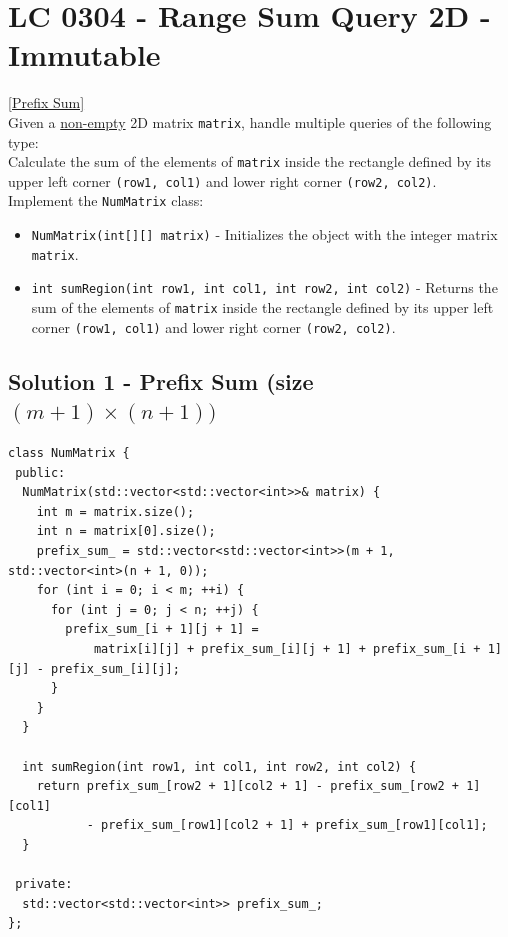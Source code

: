 \section{LC 0304 - Range Sum Query 2D - Immutable}\label{lc0304}
\hyperref[sec:prefix_sum]{[Prefix Sum]}\\

Given a \ul{non-empty} 2D matrix {\colorbox{CodeBackground}{\lstinline|matrix|}}, handle multiple queries of the following type:\\

Calculate the sum of the elements of {\colorbox{CodeBackground}{\lstinline|matrix|}} inside the rectangle defined by its upper left corner {\colorbox{CodeBackground}{\lstinline|(row1, col1)|}} and lower right corner {\colorbox{CodeBackground}{\lstinline|(row2, col2)|}}.\\

Implement the {\colorbox{CodeBackground}{\lstinline|NumMatrix|}} class:
\begin{itemize}
\item {\colorbox{CodeBackground}{\lstinline|NumMatrix(int[][] matrix)|}} - Initializes the object with the integer matrix {\colorbox{CodeBackground}{\lstinline|matrix|}}.
\item {\colorbox{CodeBackground}{\lstinline|int sumRegion(int row1, int col1, int row2, int col2)|}} - Returns the sum of the elements of {\colorbox{CodeBackground}{\lstinline|matrix|}} inside the rectangle defined by its upper left corner {\colorbox{CodeBackground}{\lstinline|(row1, col1)|}} and lower right corner {\colorbox{CodeBackground}{\lstinline|(row2, col2)|}}.
\end{itemize}

\subsection*{Solution 1 - Prefix Sum (size $(m + 1) \times (n + 1))$}
\begin{lstlisting}
class NumMatrix {
 public:
  NumMatrix(std::vector<std::vector<int>>& matrix) {
    int m = matrix.size();
    int n = matrix[0].size();
    prefix_sum_ = std::vector<std::vector<int>>(m + 1, std::vector<int>(n + 1, 0));
    for (int i = 0; i < m; ++i) {
      for (int j = 0; j < n; ++j) {
        prefix_sum_[i + 1][j + 1] =
            matrix[i][j] + prefix_sum_[i][j + 1] + prefix_sum_[i + 1][j] - prefix_sum_[i][j];
      }
    }
  }

  int sumRegion(int row1, int col1, int row2, int col2) {
    return prefix_sum_[row2 + 1][col2 + 1] - prefix_sum_[row2 + 1][col1]
           - prefix_sum_[row1][col2 + 1] + prefix_sum_[row1][col1];
  }

 private:
  std::vector<std::vector<int>> prefix_sum_;
};
\end{lstlisting}

